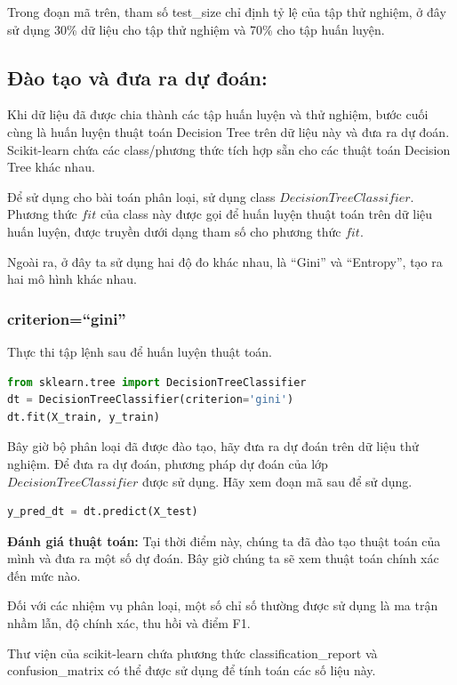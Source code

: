 Trong đoạn mã trên, tham số test\_size chỉ định tỷ lệ của tập thử nghiệm,
ở đây sử dụng 30\% dữ liệu cho tập thử nghiệm và 70\% cho tập huấn luyện.

\subsection{Đào tạo và đưa ra dự đoán:}

Khi dữ liệu đã được chia thành các tập huấn luyện và thử nghiệm,
bước cuối cùng là huấn luyện thuật toán Decision Tree trên dữ liệu này và
đưa ra dự đoán. Scikit-learn chứa các class/phương thức tích hợp sẵn
cho các thuật toán Decision Tree khác nhau.

Để sử dụng cho bài toán phân loại, sử dụng class $DecisionTreeClassifier$.
Phương thức $fit$ của class này được gọi để huấn luyện thuật toán
trên dữ liệu huấn luyện, được truyền dưới dạng tham số cho phương thức $fit$.

Ngoài ra, ở đây ta sử dụng hai độ đo khác nhau, là \enquote{Gini} và
\enquote{Entropy}, tạo ra hai mô hình khác nhau.

\subsubsection{criterion=\enquote{gini}}
Thực thi tập lệnh sau để huấn luyện thuật toán.

\begin{lstlisting}[language=Python]
from sklearn.tree import DecisionTreeClassifier
dt = DecisionTreeClassifier(criterion='gini')
dt.fit(X_train, y_train)
\end{lstlisting}

Bây giờ bộ phân loại đã được đào tạo, hãy đưa ra dự đoán
trên dữ liệu thử nghiệm.
Để đưa ra dự đoán, phương pháp dự đoán của lớp $DecisionTreeClassifier$
được sử dụng. Hãy xem đoạn mã sau để sử dụng.

\begin{lstlisting}[language=Python]
y_pred_dt = dt.predict(X_test)
\end{lstlisting}

\textbf{Đánh giá thuật toán:}
Tại thời điểm này, chúng ta đã đào tạo thuật toán của mình và đưa ra
một số dự đoán. Bây giờ chúng ta sẽ xem thuật toán chính xác đến mức nào.

Đối với các nhiệm vụ phân loại, một số chỉ số thường được sử dụng
là ma trận nhầm lẫn, độ chính xác, thu hồi và điểm F1.

Thư viện của scikit-learn chứa phương thức classification\_report và
confusion\_matrix có thể được sử dụng để tính toán các số liệu này.

